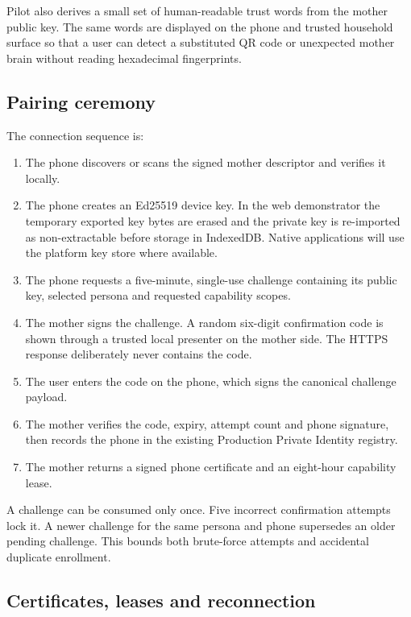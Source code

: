 Pilot also derives a small set of human-readable trust words from the mother public key.  The
same words are displayed on the phone and trusted household surface so that a user can detect a
substituted QR code or unexpected mother brain without reading hexadecimal fingerprints.

\subsection{Pairing ceremony}

The connection sequence is:
\begin{enumerate}
  \item The phone discovers or scans the signed mother descriptor and verifies it locally.
  \item The phone creates an Ed25519 device key.  In the web demonstrator the temporary exported
  key bytes are erased and the private key is re-imported as non-extractable before storage in
  IndexedDB.  Native applications will use the platform key store where available.
  \item The phone requests a five-minute, single-use challenge containing its public key, selected
  persona and requested capability scopes.
  \item The mother signs the challenge.  A random six-digit confirmation code is shown through a
  trusted local presenter on the mother side.  The HTTPS response deliberately never contains the
  code.
  \item The user enters the code on the phone, which signs the canonical challenge payload.
  \item The mother verifies the code, expiry, attempt count and phone signature, then records the
  phone in the existing Production Private Identity registry.
  \item The mother returns a signed phone certificate and an eight-hour capability lease.
\end{enumerate}

A challenge can be consumed only once.  Five incorrect confirmation attempts lock it.  A newer
challenge for the same persona and phone supersedes an older pending challenge.  This bounds both
brute-force attempts and accidental duplicate enrollment.

\subsection{Certificates, leases and reconnection}

